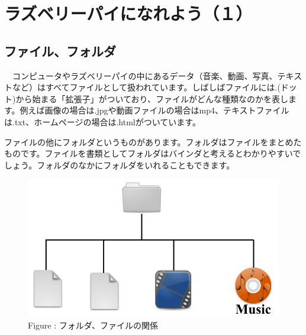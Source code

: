 \documentclass[a4paper,12pt]{jarticle}
\begin{document}
\section{ラズベリーパイになれよう（１）}
\subsection{ファイル、フォルダ}
\ \ コンピュータやラズベリーパイの中にあるデータ（音楽、動画、写真、テキストなど）はすべてファイルとして扱われています。しばしばファイルには.(ドット)から始まる「拡張子」がついており、ファイルがどんな種類なのかを表します。例えば画像の場合は.jpgや動画ファイルの場合はmp4、テキストファイルは.txt、ホームページの場合は.htmlがついています。

ファイルの他にフォルダというものがあります。フォルダはファイルをまとめたものです。ファイルを書類としてフォルダはバインダと考えるとわかりやすいでしょう。フォルダのなかにフォルダをいれることもできます。



\begin{figure}[hb]
  \centering
  \begin{minipage}{13.148cm}


    \includegraphics[width=13.148cm]{figure15.png}
    {\upshape
      \newline
      Figure :
      フォルダ、ファイルの関係}
  \end{minipage}
\end{figure}
\end{document}
